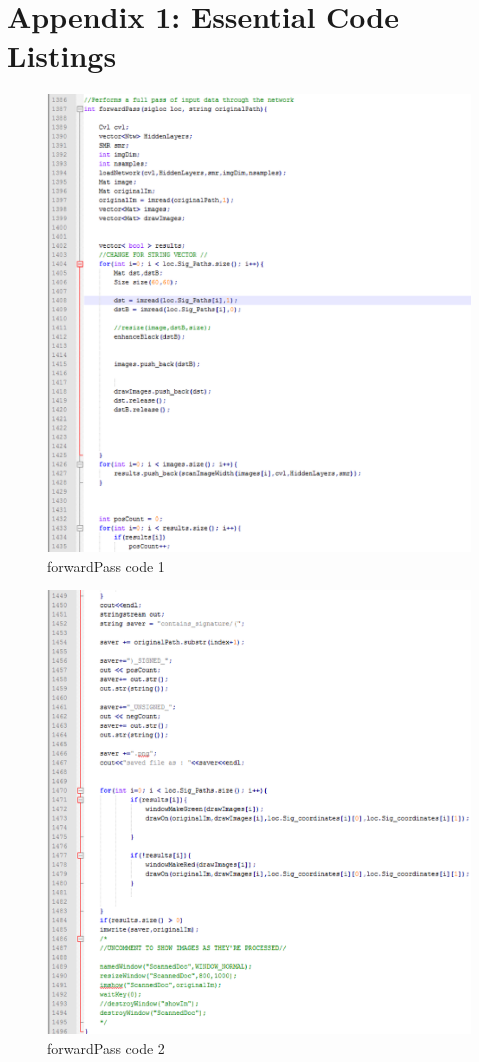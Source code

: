 \documentclass[article, onecolumn, draftclsnofoot,10pt, compsoc]{IEEEtran}
\begin{document}
\section{Appendix 1: Essential Code Listings}
\begin{figure}
  \caption{forwardPass code 1}
  \centering
  \includegraphics[width=\textwidth]{forwardPass1}
\end{figure}
\begin{figure}
  \caption{forwardPass code 2}
  \centering
  \includegraphics[width=\textwidth]{forwardPass2}
\end{figure}
\end{document}
